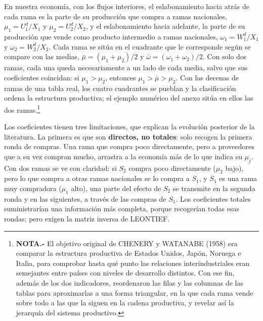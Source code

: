 \documentclass[10pt,a4paper]{article}
\newcounter{anexo}
\begin{document}
En nuestra economía, con los flujos interiores, el eslabonamiento hacia atrás de cada rama es la parte de su producción que compra a ramas nacionales, $\mu_1=U^d_1/X_1$ y $\mu_2=U^d_2/X_2$, y el eslabonamiento hacia adelante, la parte de su producción que vende como producto intermedio a ramas nacionales, $\omega_1=W^d_1/X_1$ y $\omega_2=W^d_2/X_2$. Cada rama se sitúa en el cuadrante que le corresponde según se compare con las medias, $\bar\mu=(\mu_1+\mu_2)/2$ y $\bar\omega=(\omega_1+\omega_2)/2$. Con solo dos ramas, cada una queda necesariamente a un lado de cada media, salvo que sus coeficientes coincidan: si $\mu_1>\mu_2$, entonces $\mu_1>\bar\mu>\mu_2$. Con las decenas de ramas de una tabla real, los cuatro cuadrantes se pueblan y la clasificación ordena la estructura productiva; el ejemplo numérico del anexo sitúa en ellos las dos ramas.\footnote{%
    \textbf{NOTA.-} El objetivo original de CHENERY y WATANABE (1958) era comparar la estructura productiva de Estados Unidos, Japón, Noruega e Italia, para comprobar hasta qué punto las relaciones interindustriales eran semejantes entre países con niveles de desarrollo distintos. Con ese fin, además de los dos indicadores, reordenaron las filas y las columnas de las tablas para aproximarlas a una forma triangular, en la que cada rama vende sobre todo a las que la siguen en la cadena productiva, y revelar así la jerarquía del sistema productivo.
}

Los coeficientes tienen tres limitaciones, que explican la evolución posterior de la literatura. La primera es que son \textbf{directos, no totales}: solo recogen la primera ronda de compras. Una rama que compra poco directamente, pero a proveedores que a su vez compran mucho, arrastra a la economía más de lo que indica su $\mu_j$. Con dos ramas se ve con claridad: si $S_2$ compra poco directamente ($\mu_2$ bajo), pero lo que compra a otras ramas nacionales se lo compra a $S_1$, y $S_1$ es una rama muy compradora ($\mu_1$ alto), una parte del efecto de $S_2$ se transmite en la segunda ronda y en las siguientes, a través de las compras de $S_1$. Los coeficientes totales suministrarían una información más completa, porque recogerían todas esas rondas; pero exigen la matriz inversa de LEONTIEF.
\end{document}
